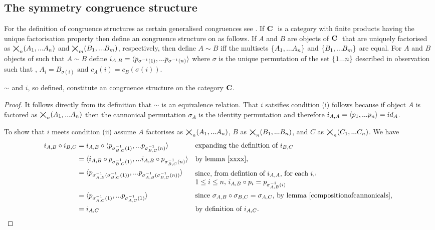 \documentclass[10pt,a4paper]{scrartcl}
\begin{document}
\subsection{The symmetry congruence structure}
For the definition of congruence structures as certain generalised congruences see \cite{Cartmell2020}.
If $\textbf{C}\ $ is a category with finite products having the unique factorisation property then define an congruence structure on \catcw as follows.
If $A$ and $B$ are objects of $\textbf{C}\ $ that are uniquely factorised as $\bigtimes_{n}(A_1,...A_n)$ and $\bigtimes_{m}(B_1,...B_m)$, respectively, then define
$A \sim B$ iff the multisets $\left\{A_1,...A_n\right\}$ and $\left\{B_1,...B_m\right\}$ are equal. 
For $A$ and $B$ objects of \catcw such that $A\sim B$ define $i_{A,B}=\langle p_{\sigma^{-1}(1)},...p_{\sigma^{-1}(n)}\rangle$ where $\sigma$ is the unique permutation of the set $\left\{1...n\right\}$ described in observation 
such that \foreachi, $A_i=B_{\sigma(i)} \mbox{ and }  c_A(i) = c_B(\sigma(i))$.  

\begin{lemma}
$\sim$ and $i$, so defined, constitute an congruence structure on the category $\textbf{C}$.
\end{lemma}
\begin{proof}
It follows directly from its definition that $\sim$ is an equivalence relation.
That $i$ satsifies condition (i) follows because if object $A$ is factored as $\bigtimes_{n}(A_1,...A_n)$
then the cannonical permutation $\sigma_A$ is the identity permutation and therefore 
$i_{A,A}=\langle p_1,...p_n\rangle=id_A$.

To show that $i$ meets condition (ii) assume $A$ factorises as $\bigtimes_{n}(A_1,...A_n)$,
$B$ as  
$\bigtimes_{n}(B_1,...B_n)$, 
and $C$ as $\bigtimes_{n}(C_1,...C_n)$. 
We have
\begin{align*}
i_{A,B} \circ i_{B,C} 
   & = i_{A,B}
				     \circ 
            \tuple {p_{\sigma_{B,C}^{-1}(1)},...p_{\sigma_{B,C}^{-1}(n)}}
						        && \mbox{expanding the definition of $i_{B,C}$ }\\
	 & = \tuple{i_{A,B} \circ p_{\sigma_{B,C}^{-1}(1)},...i_{A,B} \circ p_{\sigma_{B,C}^{-1}(n)}}                    && \mbox{by lemma \ref{xxxx}},\\
	 & = \tuple {p_{\sigma_{A,B}^{-1}(\sigma_{B,C}^{-1}(1))},...
					                                       p_{\sigma_{A,B}^{-1}(\sigma_{B,C}^{-1}(n))}}
										&& \mbox{\raisebox{-10pt}{\parbox{6cm}{since, from defintion of $i_{A,A}$, \foreachi, $i_{A,B} \circ p_i = p_{\sigma_{A,B}^{-1}(i)}$}}}, \\
   & = \tuple {p_{\sigma_{A,C}^{-1}(1)},...p_{\sigma_{A,C}^{-1}(1)}}
                  && \mbox{since $\sigma_{A,B} \circ \sigma_{B,C}  = \sigma_{A,C}$, by lemma \ref{compositionofcannonicals}, } \\
	 & = i_{A,C}      && \mbox{by definition of $i_{A,C}$}.	
\end{align*}                     
\end{proof}
\end{document}
